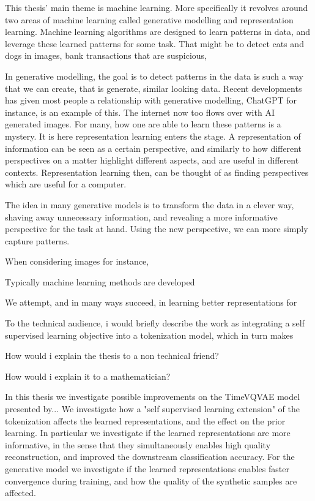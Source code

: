 \documentclass[../../thesis.tex]{subfiles}
\begin{document}
This thesis' main theme is machine learning. More specifically it revolves around two areas of machine learning called generative modelling and representation learning. Machine learning algorithms are designed to learn patterns in data, and leverage these learned patterns for some task. That might be to detect cats and dogs in images, bank transactions that are suspicious, 

In generative modelling, the goal is to detect patterns in the data is such a way that we can create, that is generate, similar looking data. Recent developments has given most people a relationship with generative modelling, ChatGPT for instance, is an example of this. The internet now too flows over with AI generated images. For many, how one are able to learn these patterns is a mystery. It is here representation learning enters the stage. A representation of information can be seen as a certain perspective, and similarly to how different perspectives on a matter highlight different aspects, and are useful in different contexts. Representation learning then, can be thought of as finding perspectives which are useful for a computer. 

The idea in many generative models is to transform the data in a clever way, shaving away unnecessary information, and revealing a more informative perspective for the task at hand. Using the new perspective, we can more simply capture patterns. 






When considering images for instance, 

Typically machine learning methods are developed 


We attempt, and in many ways succeed, in learning better representations for 

To the technical audience, i would briefly describe the work as integrating a self supervised learning objective into a tokenization model, which in turn makes 


How would i explain the thesis to a non technical friend?

How would i explain it to a mathematician?

In this thesis we investigate possible improvements on the TimeVQVAE model presented by... We investigate how a "self supervised learning extension" of the tokenization affects the learned representations, and the effect on the prior learning. In particular we investigate if the learned representations are more informative, in the sense that they simultaneously enables high quality reconstruction, and improved the downstream classification accuracy. For the generative model we investigate if the learned representations enables faster convergence during training, and how the quality of the synthetic samples are affected. \\
\end{document}
